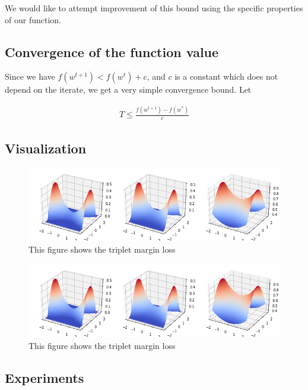 \documentclass[11pt]{article}
\begin{document}
We would like to attempt improvement of this bound using the specific properties of our function.

\subsection{Convergence of the function value}

Since we have $f(w^{t+1}) < f(w^t) + c$, and $c$ is a constant which does not depend on the iterate, we get a very simple convergence bound. Let

\begin{align*}
    T \leq \frac{f(w^{t+1}) - f(w^*)}{c}
\end{align*}

\subsection{Visualization}


\begin{figure}
  \centering
  \includegraphics[width=\textwidth]{figures/triplet_viz.png}
  \caption{This figure shows the triplet margin loss }
\end{figure}

\begin{figure}
  \centering
  \includegraphics[width=\textwidth]{figures/triplet_viz.png}
  \caption{This figure shows the triplet margin loss }
\end{figure}

\subsection{Experiments}
\end{document}
